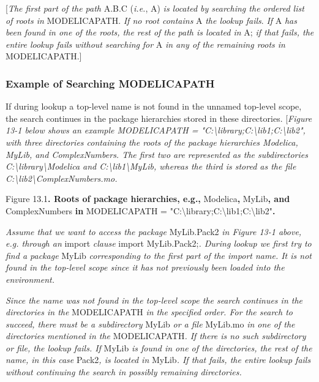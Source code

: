 \documentclass[10pt,a4paper]{report}
\def\doublelabel#1{\label{#1}\hypertarget{#1}{}}
\begin{document}
{[}\emph{The first part of the path} A.B.C (\emph{i.e.}, A) \emph{is
located by searching the ordered list of roots in} MODELICAPATH.
\emph{If no root contains} A \emph{the lookup fails}. \emph{If} A
\emph{has been found in one of the roots, the rest of the path is
located in} A; \emph{if that fails, the entire lookup fails without
searching} \emph{for} A \emph{in any of the remaining roots in}
MODELICAPATH.{]}

\subsubsection{Example of Searching MODELICAPATH}\doublelabel{example-of-searching-modelicapath}

If during lookup a top-level name is not found in the unnamed top-level
scope, the search continues in the package hierarchies stored in these
directories. {[}\emph{Figure 13-1 below shows an example MODELICAPATH =
"C:\textbackslash{}library;C:\textbackslash{}lib1;C:\textbackslash{}lib2",
with three directories containing the roots of the package hierarchies
Modelica, MyLib, and ComplexNumbers. The first two are represented as
the subdirectories C:\textbackslash{}library\textbackslash{}Modelica and
C:\textbackslash{}lib1\textbackslash{}MyLib, whereas the third is stored
as the file C:\textbackslash{}lib2\textbackslash{}ComplexNumbers.mo.}

Figure 13.1\textbf{. Roots of package hierarchies, e.g.,}
Modelica\textbf{,} MyLib\textbf{, and} ComplexNumbers \textbf{in}
MODELICAPATH =
"C:\textbackslash{}library;C:\textbackslash{}lib1;C:\textbackslash{}lib2"\textbf{.}

\emph{Assume that we want to access the package} MyLib.Pack2 \emph{in
Figure 13-1 above, e.g. through an} import \emph{clause} import
MyLib.Pack2;\emph{. During lookup we first try to find a package} MyLib
\emph{corresponding to the first part of the import name. It is not
found in the top-level scope since it has not previously been loaded
into the environment. }

\emph{Since the name was not found in the top-level scope the search
continues in the directories in the} MODELICAPATH \emph{in the specified
order. For the search to succeed, there must be a subdirectory} MyLib
\emph{or a file} MyLib.mo \emph{in one of the directories mentioned in
the} MODELICAPATH\emph{. If there is no such subdirectory or file, the
lookup fails. If} MyLib \emph{is found in one of the directories, the
rest of the name, in this case} Pack2\emph{, is located in} MyLib\emph{.
If that fails, the entire lookup fails without continuing the search in
possibly remaining directories.}
\end{document}
